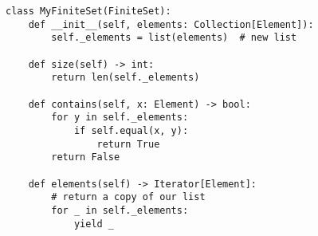 \par\begin{minipage}{60ex}
\begin{verbatim}
class MyFiniteSet(FiniteSet):
    def __init__(self, elements: Collection[Element]):
        self._elements = list(elements)  # new list

    def size(self) -> int:
        return len(self._elements)

    def contains(self, x: Element) -> bool:
        for y in self._elements:
            if self.equal(x, y):
                return True
        return False

    def elements(self) -> Iterator[Element]:
        # return a copy of our list
        for _ in self._elements:
            yield _
\end{verbatim}
\end{minipage}\par